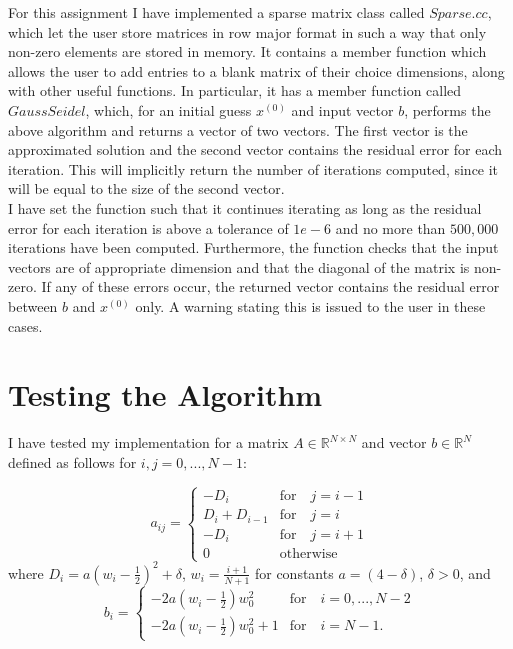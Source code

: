 \documentclass[10pt]{article}
\begin{document}
For this assignment I have implemented a sparse matrix class called $\textit{Sparse.cc}$, which let the user store matrices in row major format in such a way that only non-zero elements are stored in memory. It contains a member function which allows the user to add entries to a blank matrix of their choice dimensions, along with other useful functions. In particular, it has a member function called $\textit{GaussSeidel}$, which, for an initial guess $x^{(0)}$ and input vector $b$, performs the above algorithm and returns a vector of two vectors. The first vector is the approximated solution and the second vector contains the residual error for each iteration. This will implicitly return the number of iterations computed, since it will be equal to the size of the second vector.\\

I have set the function such that it continues iterating as long as the residual error for each iteration is above a tolerance of $1e - 6$ and no more than $500,000$ iterations have been computed. Furthermore, the function checks that the input vectors are of appropriate dimension and that the diagonal of the matrix is non-zero. If any of these errors occur, the returned vector contains the residual error between $b$ and $x^{(0)}$ only. A warning stating this is issued to the user in these cases.

\section{Testing the Algorithm}
I have tested my implementation for a matrix $A \in \mathbb{R}^{N \times N}$ and vector $b \in \mathbb{R}^N$ defined as follows for $i,j = 0,...,N-1$:

$$a_{ij}=
\begin{cases}
-D_i &\text{for} \quad j = i-1\\
D_i + D_{i-1} &\text{for} \quad j=i\\
-D_{i} &\text{for} \quad j = i + 1\\
0 &\text{otherwise}
\end{cases}
$$
where $D_i=a(w_i - \frac{1}{2})^2 + \delta$, $w_i = \frac{i+1}{N+1}$ for constants $a=(4-\delta)$, $\delta > 0$, and
$$b_{i}=
\begin{cases}
-2a(w_i - \frac{1}{2})w_0^2 &\text{for} \quad i = 0,...,N-2\\
-2a(w_i - \frac{1}{2})w_0^2 + 1 &\text{for} \quad i=N-1.
\end{cases}
$$
\end{document}
